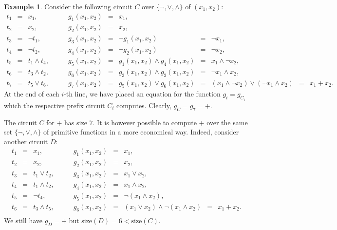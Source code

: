 \documentclass[12pt,notitlepage]{article}
\theoremstyle{plain}
\theoremstyle{definition}
\newtheorem{exm}[thm]{Example}
\theoremstyle{plain}
\newcommand{\1}{\mathbf{1}}
\newcommand{\0}{\mathbf{0}}
\begin{document}
\begin{exm}\label{bool:xor_circuits}
Consider the following circuit $C$ over $\{ {\neg}, {\vee}, {\wedge} \}$ of $(x_1, x_2)$:
$$
\begin{array}{rclrclclcl}
t_1 &=& x_1,\qquad &g_1(x_1, x_2) &=& x_1,\\
t_2 &=& x_2,\qquad &g_2(x_1, x_2) &=& x_2,\\
t_3 &=& \neg t_1,\qquad &g_3(x_1, x_2) &=&  \neg g_1(x_1, x_2) &=&  \neg x_1,\\
t_4 &=& \neg t_2,\qquad &g_4(x_1, x_2) &=&  \neg g_2(x_1, x_2) &=&  \neg x_2,\\
t_5 &=& t_1 \wedge t_4,\qquad &g_5(x_1, x_2) &=&  g_1(x_1, x_2) \wedge g_4(x_1, x_2) &=&  x_1 \wedge \neg x_2,\\
t_6 &=& t_3 \wedge t_2,\qquad &g_6(x_1, x_2) &=&  g_3(x_1, x_2) \wedge g_2(x_1, x_2) &=&  \neg x_1 \wedge x_2,\\
t_7 &=& t_5 \vee t_6,\qquad &g_7(x_1, x_2) &=&  g_5(x_1, x_2) \vee g_6(x_1, x_2) &=& (x_1 \wedge \neg x_2) \vee (\neg x_1 \wedge x_2) &=& x_1 + x_2.
\end{array}
$$
At the end of each $i$-th line, we have placed an equation for the function $g_i = g_{C_i}$ which the respective prefix circuit $C_i$ computes. Clearly, $g_C = g_7 = {+}$.

The circuit $C$ for ${+}$ has size $7$. It is however possible to compute ${+}$ over the same set $\{ {\neg}, {\vee}, {\wedge} \}$ of primitive functions in a more economical way. Indeed, consider another circuit $D$:
$$
\begin{array}{rclrclcl}
t_1 &=& x_1,\qquad &g_1(x_1, x_2) &=& x_1,\\
t_2 &=& x_2,\qquad &g_2(x_1, x_2) &=& x_2,\\
t_3 &=& t_1 \vee t_2,\qquad &g_3(x_1, x_2) &=&  x_1 \vee x_2,\\
t_4 &=& t_1 \wedge t_2,\qquad &g_4(x_1, x_2) &=& x_1 \wedge x_2,\\
t_5 &=& \neg t_4,\qquad &g_5(x_1, x_2) &=&  \neg (x_1 \wedge x_2),\\
t_6 &=& t_3 \wedge t_5,\qquad &g_6(x_1, x_2) &=&  (x_1 \vee x_2) \wedge \neg (x_1 \wedge x_2) &=& x_1 + x_2.\\
\end{array}
$$
We still have $g_D = {+}$ but $\mathrm{size}(D) = 6 < \mathrm{size}(C)$.
\end{exm}
\end{document}
